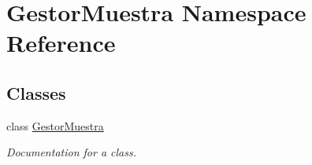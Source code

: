 \hypertarget{namespace_gestor_muestra}{}\section{Gestor\+Muestra Namespace Reference}
\label{namespace_gestor_muestra}
\subsection*{Classes}
\begin{DoxyCompactItemize}
\item 
class \mbox{\hyperlink{class_gestor_muestra_1_1_gestor_muestra}{Gestor\+Muestra}}
\begin{DoxyCompactList}\small\item\em Documentation for a class. \end{DoxyCompactList}\end{DoxyCompactItemize}
